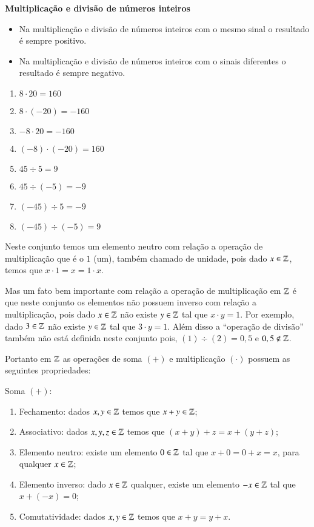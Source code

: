 \textbf{Multiplicação e divisão de números inteiros}

  \begin{itemize}
   \item Na multiplicação e divisão de números inteiros com o mesmo sinal o resultado é sempre positivo.
   \item Na multiplicação e divisão de números inteiros com o sinais diferentes o resultado é sempre negativo.
  \end{itemize}

  \begin{multicols}{2}
  \begin{enumerate}[1)]
   \item $8 \cdot 20= 160$
   \item $8 \cdot (-20)= -160$
   \item $-8 \cdot 20= -160$
   \item $(-8) \cdot (-20)= 160$
   \item $45 \div 5= 9$
   \item $45 \div (-5)= -9$
   \item $(-45) \div 5= -9$
   \item $(-45) \div (-5)= 9$
  \end{enumerate}
  \end{multicols}

 Neste conjunto temos um elemento neutro com relação a operação de multiplicação que é o $1$ (um), também chamado de unidade, pois dado $x \in \mathbb{Z}$, temos que $x \cdot 1= x= 1 \cdot x$.

 Mas um fato bem importante com relação a operação de multiplicação em $\mathbb{Z}$ é que neste conjunto os elementos não possuem inverso com relação a multiplicação, pois dado $x \in \mathbb{Z}$ não existe $y \in \mathbb{Z}$ tal que $x \cdot y= 1$. Por exemplo, dado $3 \in \mathbb{Z}$ não existe $y \in \mathbb{Z}$ tal que $3 \cdot y= 1$. Além disso a ``operação de divisão'' também não está definida neste conjunto pois, $(1)\div (2)= 0,5$ e $0,5 \notin \mathbb{Z}$.
 
   \vskip0.3cm
 
 Portanto em $\mathbb{Z}$ as operações de soma $(+)$ e multiplicação $(\cdot)$ possuem as seguintes propriedades:
 
 Soma $(+)$:
 \begin{enumerate}[1)]
 \item Fechamento: dados $x, y \in \mathbb{Z}$ temos que $x+y \in \mathbb{Z}$;
 \item Associativo: dados $x, y, z \in \mathbb{Z}$ temos que $(x+y)+z= x+(y+z)$;
 \item Elemento neutro: existe um elemento $0 \in \mathbb{Z}$ tal que $x+0=0+x=x$, para qualquer $x \in \mathbb{Z}$;
 \item Elemento inverso: dado $x \in \mathbb{Z}$ qualquer, existe um elemento $-x \in \mathbb{Z}$ tal que $x+(-x)=0$;
 \item Comutatividade: dados $x, y \in \mathbb{Z}$ temos que $x+y= y+x$. 
 \end{enumerate}
 
